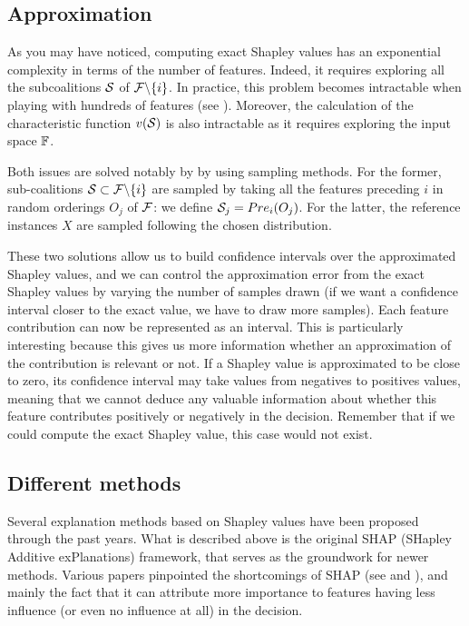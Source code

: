 \subsection{Approximation}

As you may have noticed, computing exact Shapley values has an exponential complexity in terms of the number 
of features. Indeed, it requires exploring all the subcoalitions $\mathcal{S}$ of $\mathcal{F}\backslash\{i\}$. In practice, 
this problem becomes intractable when playing with hundreds of features (see \textcite{strumbelj_efficient_2010}). 
Moreover, the calculation of the characteristic function $v(\mathcal{S})$ is also intractable as it requires 
exploring the input space $\mathbb{F}$.

Both issues are solved notably by \textcite{merrick_explanation_2020} by using sampling methods. 
For the former, sub-coalitions $\mathcal{S} \subset \mathcal{F}\backslash\{i\}$ are sampled by taking all the 
features preceding $i$ in random orderings $O_j$ of $\mathcal{F}$: we define $\mathcal{S}_j = Pre_i(O_j)$. For the latter, the reference instances $X$ are sampled following the chosen distribution.

\begin{remark}
    These two solutions allow us to build confidence intervals over the approximated Shapley values, and we can control the approximation error from the exact Shapley values by varying the number of samples drawn (if we want a confidence interval closer to the exact value, we have to draw more samples).
    Each feature contribution can now be represented as an interval. This is particularly interesting because 
    this gives us more information whether an approximation of the contribution is relevant or not. If a Shapley 
    value is approximated to be close to zero, its confidence interval may take values from negatives to positives 
    values, meaning that we cannot deduce any valuable information about whether this feature contributes 
    positively or negatively in the decision. Remember that if we could compute the exact Shapley value, this 
    case would not exist.
\end{remark}

\subsection{Different methods}

Several explanation methods based on Shapley values have been proposed through the past years. What is described 
above is the original SHAP (SHapley Additive exPlanations) framework, that serves as the groundwork for newer 
methods. Various papers pinpointed the shortcomings of SHAP (see \textcite{letoffe_towards_2025} and \textcite{fryer_shapley_2021}), 
and mainly the fact that it can attribute more importance to features having less influence (or even no influence 
at all) in the decision.

